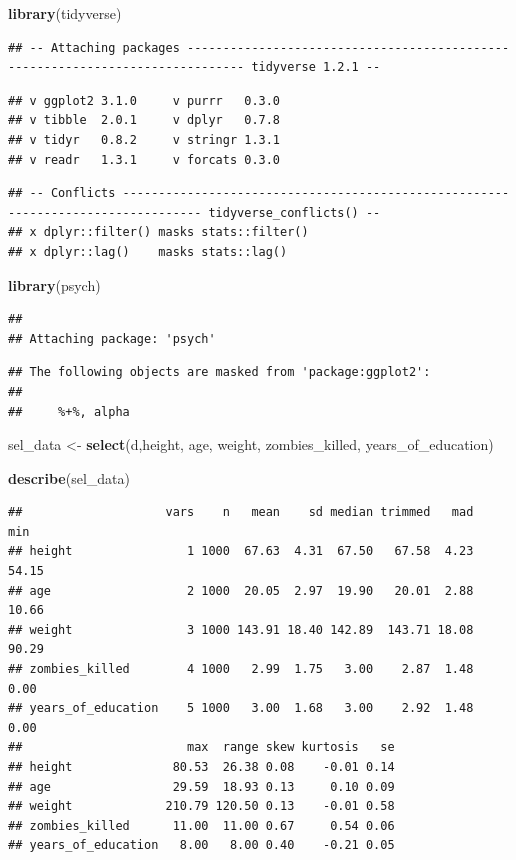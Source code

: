\documentclass[]{article}
\newenvironment{Shaded}{\begin{snugshade}}{\end{snugshade}}
\newcommand{\KeywordTok}[1]{\textcolor[rgb]{0.13,0.29,0.53}{\textbf{#1}}}
\newcommand{\StringTok}[1]{\textcolor[rgb]{0.31,0.60,0.02}{#1}}
\newcommand{\NormalTok}[1]{#1}
\begin{document}
\begin{Shaded}
\begin{Highlighting}[]
\KeywordTok{library}\NormalTok{(tidyverse)}
\end{Highlighting}
\end{Shaded}

\begin{verbatim}
## -- Attaching packages ------------------------------------------------------------------------------ tidyverse 1.2.1 --
\end{verbatim}

\begin{verbatim}
## v ggplot2 3.1.0     v purrr   0.3.0
## v tibble  2.0.1     v dplyr   0.7.8
## v tidyr   0.8.2     v stringr 1.3.1
## v readr   1.3.1     v forcats 0.3.0
\end{verbatim}

\begin{verbatim}
## -- Conflicts --------------------------------------------------------------------------------- tidyverse_conflicts() --
## x dplyr::filter() masks stats::filter()
## x dplyr::lag()    masks stats::lag()
\end{verbatim}

\begin{Shaded}
\begin{Highlighting}[]
\KeywordTok{library}\NormalTok{(psych)}
\end{Highlighting}
\end{Shaded}

\begin{verbatim}
## 
## Attaching package: 'psych'
\end{verbatim}

\begin{verbatim}
## The following objects are masked from 'package:ggplot2':
## 
##     %+%, alpha
\end{verbatim}

\begin{Shaded}
\begin{Highlighting}[]
\NormalTok{sel_data <-}\StringTok{ }\KeywordTok{select}\NormalTok{(d,height, age, weight, zombies_killed, years_of_education)}

\KeywordTok{describe}\NormalTok{(sel_data)}
\end{Highlighting}
\end{Shaded}

\begin{verbatim}
##                    vars    n   mean    sd median trimmed   mad   min
## height                1 1000  67.63  4.31  67.50   67.58  4.23 54.15
## age                   2 1000  20.05  2.97  19.90   20.01  2.88 10.66
## weight                3 1000 143.91 18.40 142.89  143.71 18.08 90.29
## zombies_killed        4 1000   2.99  1.75   3.00    2.87  1.48  0.00
## years_of_education    5 1000   3.00  1.68   3.00    2.92  1.48  0.00
##                       max  range skew kurtosis   se
## height              80.53  26.38 0.08    -0.01 0.14
## age                 29.59  18.93 0.13     0.10 0.09
## weight             210.79 120.50 0.13    -0.01 0.58
## zombies_killed      11.00  11.00 0.67     0.54 0.06
## years_of_education   8.00   8.00 0.40    -0.21 0.05
\end{verbatim}
\end{document}
